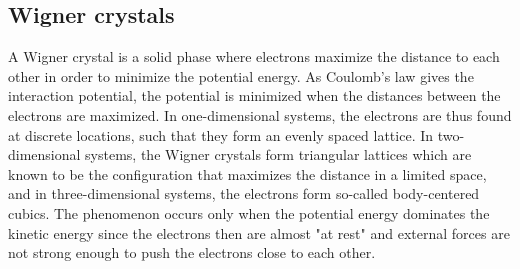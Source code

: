 \subsection{Wigner crystals} \label{sec:wigner}
A Wigner crystal is a solid phase where electrons maximize the distance to each other in order to minimize the potential energy. As Coulomb's law gives the interaction potential, the potential is minimized when the distances between the electrons are maximized. In one-dimensional systems, the electrons are thus found at discrete locations, such that they form an evenly spaced lattice. In two-dimensional systems, the Wigner crystals form triangular lattices which are known to be the configuration that maximizes the distance in a limited space, and in three-dimensional systems, the electrons form so-called body-centered cubics. The phenomenon occurs only when the potential energy dominates the kinetic energy since the electrons then are almost "at rest" and external forces are not strong enough to push the electrons close to each other.


